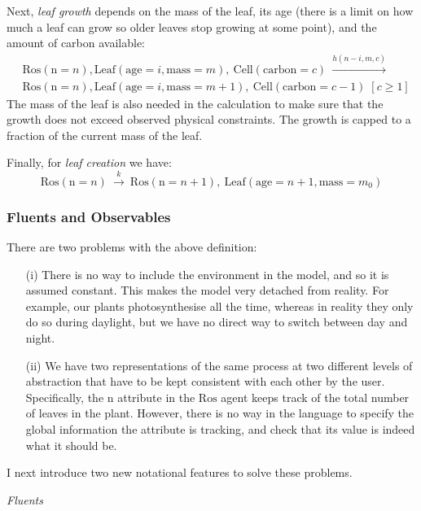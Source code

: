 Next, \textit{leaf growth} depends on the mass of the leaf, its age (there is a
limit on how much a leaf can grow so older leaves stop growing at some point),
and the amount of carbon available:
%
\begin{align*}
  & \mathrm{Ros}(\mathrm{n}=n), \mathrm{Leaf}(\mathrm{age}=i,
\mathrm{mass}=m),\: \mathrm{Cell}(\mathrm{carbon}=c) \: \xrightarrow{h(n-i, m,
    c)}\: \\
  & \mathrm{Ros}(\mathrm{n} =n), \mathrm{Leaf}(\mathrm{age}=i,
\mathrm{mass}=m+1),\: \mathrm{Cell}(\mathrm{carbon}=c-1) \; [c \geq 1]
\end{align*} The mass of the leaf is also needed in the calculation to make sure
that the growth does not exceed observed physical constraints. The growth is
capped to a fraction of the current mass of the leaf.

Finally, for \textit{leaf creation} we have:
\begin{equation*} \mathrm{Ros}(\mathrm{n}=n) \: \xrightarrow{k} \:
\mathrm{Ros}(\mathrm{n}=n+1), \: \mathrm{Leaf}(\mathrm{age}=n+1,
\mathrm{mass}=m_0)
\end{equation*}

\subsubsection*{Fluents and Observables}
There are two problems with the above definition: 
\begin{itemize}
\item[(i)] There is no way to include the environment in the model, and so it is
  assumed constant. This makes the model very detached from reality.  For
  example, our plants photosynthesise all the time, whereas in reality they only
  do so during daylight, but we have no direct way to switch between day and
  night.
\item[(ii)] We have two representations of the same process at two different
  levels of abstraction that have to be kept consistent with each other by the
  user.  Specifically, the $\mathrm{n}$ attribute in the $\mathrm{Ros}$ agent
  keeps track of the total number of leaves in the plant. However, there is no
  way in the language to specify the global information the attribute is
  tracking, and check that its value is indeed what it should be.
\end{itemize}

I next introduce two new notational features
to solve these problems.

\textit{Fluents}

